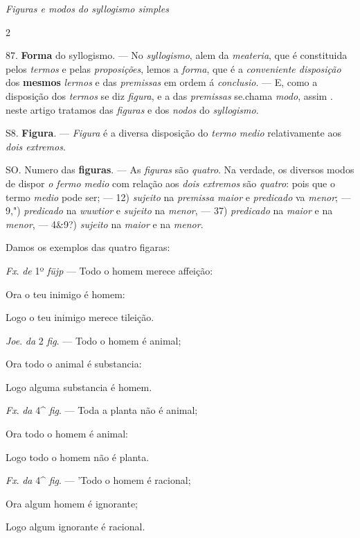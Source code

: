  \emph{Figuras e modos do syllogismo simples}

2

87. \textbf{Forma} do syllogismo. --- No \emph{syllogismo}, alem da \emph{meateria}, que é constituida pelos \emph{termos} e pelas \emph{proposições}, lemos a \emph{forma}, que é a \emph{conveniente disposição} dos \textbf{mesmos} \emph{lermos} e das \emph{premissas} em ordem á \emph{conclusio}. --- E, como a disposição dos \emph{termos} se diz \emph{figura}, e a das \emph{premissas} se.chama \emph{modo}, assim . neste artigo tratamos das \emph{figuras} e dos \emph{nodos} do \emph{syllogismo}.

S8. \textbf{Figura}. --- \emph{Figura} é a diversa disposição do \emph{termo medio} relativamente aos \emph{dois extremos}.

SO. Numero das \textbf{figuras}. --- As \emph{figuras} são \emph{quatro}. Na verdade, os diversos modos de dispor \emph{o fermo medio} com relação aos \emph{dois extremos} são \emph{quatro}: pois que o termo \emph{medio} pode ser; --- 12) \emph{sujeito} na \emph{premissa maior} e \emph{predicado} va \emph{menor}; --- 9,") \emph{predicado} na \emph{wuwtior} e \emph{sujeito} na \emph{menor}, --- 37) \emph{predicado} na \emph{maior} e na \emph{menor}, --- 4\&9?) \emph{sujeito} na \emph{maior} e na \emph{menor}.

Damos os exemplos das quatro figaras:

\emph{Fx}. \emph{de} 1º \emph{füjp} --- Todo o homem merece affeição:

Ora o teu inimigo é homem:

Logo o teu inimigo merece tileição.

\emph{Joe}. \emph{da} 2 \emph{fig}. --- Todo o homem é animal;

Ora todo o animal é substancia:

Logo alguma substancia é homem.

\emph{Fx}. \emph{da} 4\textasciicircum{} \emph{fig}. --- Toda a planta não é animal;

Ora todo o homem é animal:

Logo todo o homem não é planta.

\emph{Fx}. \emph{da} 4\textasciicircum{} \emph{fig}. --- 'Todo o homem é racional;

Ora algum homem é ignorante;

Logo algum ignorante é racional.

